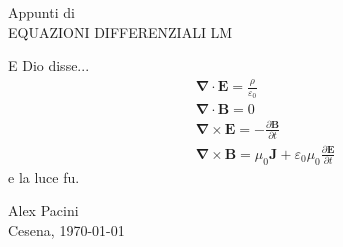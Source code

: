 \begin{titlepage}
\begin{center}
\vfill
%
{\LARGE{\sc Appunti di}}\\
\vspace{10mm} 
{\Huge {EQUAZIONI DIFFERENZIALI LM}} \\
\end{center}
%
\vspace{45mm}
\LARGE {E Dio disse...}
%
\begin{align*}
& \boldsymbol{\nabla} \cdot \boldsymbol{E} = \frac{\rho}{\varepsilon_0} \\
& \boldsymbol{\nabla} \cdot \boldsymbol{B} = 0 \\
& \boldsymbol{\nabla} \times \boldsymbol{E} = - \frac{\partial \boldsymbol{B}}{\partial t} \\
& \boldsymbol{\nabla} \times \boldsymbol{B} = \mu_0 \boldsymbol{J} + \varepsilon_0 \mu_0 \frac{\partial \boldsymbol{E}}{\partial t}
\end{align*}
%
\LARGE e la luce fu.
%
\vfill
\begin{center}
{\Large {Alex Pacini}}\\
\vspace{5mm}
{\large Cesena, \today}
\end{center}


\end{titlepage}
